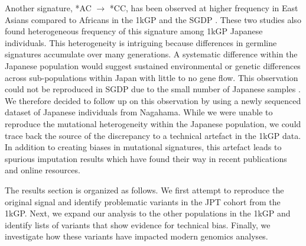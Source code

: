 \documentclass[9pt,article]{template}
\begin{document}
Another signature, *AC $\rightarrow$ *CC, has been observed at higher frequency in East Asians compared to Africans in the 1kGP and the SGDP  \citep{Aikens2018, Harris2017a}. 
 These two studies also found heterogeneous frequency of this signature among 1kGP Japanese individuals.
This heterogeneity is intriguing because differences in germline signatures accumulate over many generations.
A systematic difference within the Japanese population would suggest sustained environmental or genetic differences across sub-populations within Japan with little to no gene flow. This observation could not be reproduced in SGDP due to the small number of Japanese samples \citep{Aikens2018}.
We therefore decided to follow up on this observation by using a newly sequenced dataset of Japanese individuals from Nagahama.
While we were unable to reproduce the mutational heterogeneity within the Japanese population, we could trace back the source of the discrepancy to a technical artefact in the 1kGP data.
In addition to creating biases in mutational signatures, this artefact leads to spurious imputation results which have found their way in recent publications and online resources.


The results section is organized as follows.
We first attempt to reproduce the original signal and identify problematic variants in the JPT cohort from the 1kGP. 
Next, we expand our analysis to the other populations in the 1kGP and identify lists of variants that show evidence for technical bias.
Finally, we investigate how these variants have impacted modern genomics analyses.
  
\end{document}
